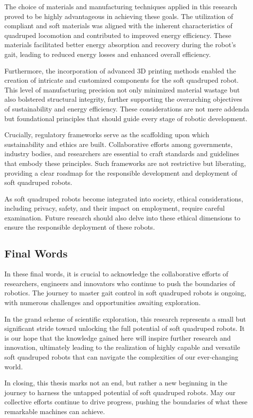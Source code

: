 The choice of materials and manufacturing techniques applied in this research proved to be highly advantageous in achieving these goals. The utilization of compliant and soft materials was aligned with the inherent characteristics of quadruped locomotion and contributed to improved energy efficiency. These materials facilitated better energy absorption and recovery during the robot's gait, leading to reduced energy losses and enhanced overall efficiency.

Furthermore, the incorporation of advanced 3D printing methods enabled the creation of intricate and customized components for the soft quadruped robot. This level of manufacturing precision not only minimized material wastage but also bolstered structural integrity, further supporting the overarching objectives of sustainability and energy efficiency. These considerations are not mere addenda but foundational principles that should guide every stage of robotic development.

Crucially, regulatory frameworks serve as the scaffolding upon which sustainability and ethics are built. Collaborative efforts among governments, industry bodies, and researchers are essential to craft standards and guidelines that embody these principles. Such frameworks are not restrictive but liberating, providing a clear roadmap for the responsible development and deployment of soft quadruped robots.

As soft quadruped robots become integrated into society, ethical considerations, including privacy, safety, and their impact on employment, require careful examination. Future research should also delve into these ethical dimensions to ensure the responsible deployment of these robots.

\subsection{Final Words}
In these final words, it is crucial to acknowledge the collaborative efforts of researchers, engineers and innovators who continue to push the boundaries of robotics. The journey to master gait control in soft quadruped robots is ongoing, with numerous challenges and opportunities awaiting exploration.

In the grand scheme of scientific exploration, this research represents a small but significant stride toward unlocking the full potential of soft quadruped robots. It is our hope that the knowledge gained here will inspire further research and innovation, ultimately leading to the realization of highly capable and versatile soft quadruped robots that can navigate the complexities of our ever-changing world.

In closing, this thesis marks not an end, but rather a new beginning in the journey to harness the untapped potential of soft quadruped robots. May our collective efforts continue to drive progress, pushing the boundaries of what these remarkable machines can achieve.






